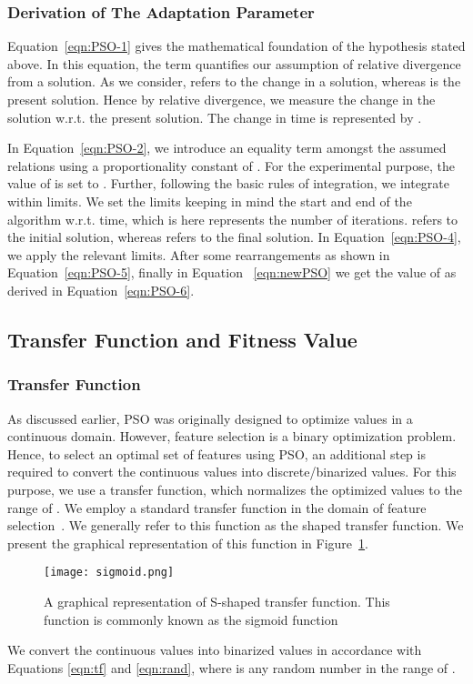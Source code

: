 \documentclass[final,3p,times]{elsarticle}
\begin{document}
\subsubsection{Derivation of The Adaptation Parameter}
{Equation~\ref{eqn:PSO-1} gives the mathematical foundation of the hypothesis stated above. In this equation, the term  quantifies our assumption of relative divergence from a solution. {As we consider,}  refers to the change in a solution, whereas  is the present {solution. Hence} by relative {divergence,} we measure the change in the solution w.r.t. the present solution. The change in time is represented by .}

{In Equation~\ref{eqn:PSO-2}, we introduce an equality term amongst the assumed {relations} using a proportionality constant of . For the experimental purpose, the value of  is set to . Further, following the basic rules of integration, we integrate within {limits. We set the limits} keeping in mind the start and end of the algorithm w.r.t. time, {which is here} represents the number of iterations.  refers to the initial solution, whereas  refers to the final solution. In Equation~\ref{eqn:PSO-4}, we apply the relevant limits. After some rearrangements as shown in Equation~\ref{eqn:PSO-5}, finally in Equation ~\ref{eqn:newPSO} we get the value of  as derived in Equation~\ref{eqn:PSO-6}.}
\subsection{Transfer Function and Fitness Value}
\subsubsection{Transfer Function}
As discussed earlier, PSO was originally designed to optimize values in a continuous domain. However, feature selection is a binary optimization problem. Hence, to select an optimal set of features using PSO, an additional step is required to convert the continuous values into {discrete/binarized values.} For this purpose, we use a transfer function, which normalizes the optimized values to the range of . We employ a standard transfer function in the domain of feature selection~\cite{chattopadhyay2021Pneumonia,ahmed2022binary}. {We generally refer to this} function as the shaped transfer {function. We present} the graphical representation of this function in Figure~\ref{fig:transfer}.
\begin{figure}
    \centering
    \texttt{[image: sigmoid.png]}
    \caption{A graphical representation of S-shaped transfer function. This function is commonly known as the sigmoid function}
    \label{fig:transfer}
\end{figure}
We convert the continuous values into binarized values in accordance with Equations \ref{eqn:tf} and \ref{eqn:rand}, where  is any random number in the range of .
\end{document}
